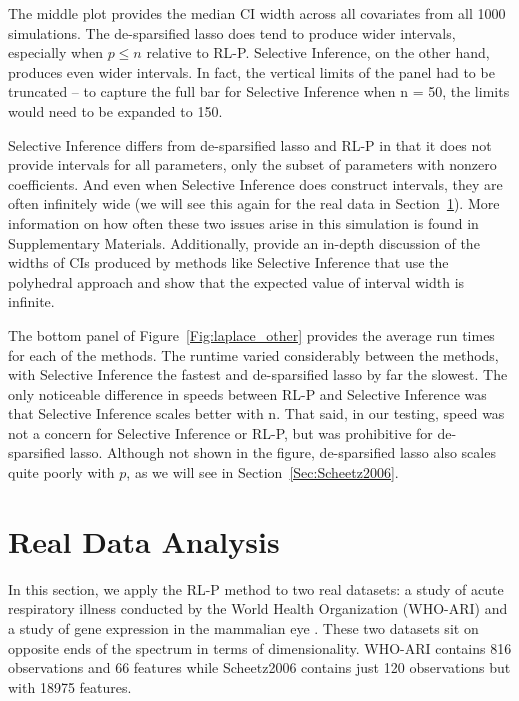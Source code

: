 The middle plot provides the median CI width across all covariates from all 1000 simulations. The de-sparsified lasso does tend to produce wider intervals, especially when $p \le n$ relative to RL-P. Selective Inference, on the other hand, produces even wider intervals. In fact, the vertical limits of the panel had to be truncated -- to capture the full bar for Selective Inference when n = 50, the limits would need to be expanded to 150.

Selective Inference differs from de-sparsified lasso and RL-P in that it does not provide intervals for all parameters, only the subset of parameters with nonzero coefficients. And even when Selective Inference does construct intervals, they are often infinitely wide (we will see this again for the real data in Section~\ref{Sec:RDA}). More information on how often these two issues arise in this simulation is found in Supplementary Materials. Additionally, \cite{Kivaranovic2021} provide an in-depth discussion of the widths of CIs produced by methods like Selective Inference that use the polyhedral approach and show that the expected value of interval width is infinite.

The bottom panel of Figure~\ref{Fig:laplace_other} provides the average run times for each of the methods. The runtime varied considerably between the methods, with Selective Inference the fastest and de-sparsified lasso by far the slowest.  The only noticeable difference in speeds between RL-P and Selective Inference was that Selective Inference scales better with n. That said, in our testing, speed was not a concern for Selective Inference or RL-P, but was prohibitive for de-sparsified lasso. Although not shown in the figure, de-sparsified lasso also scales quite poorly with $p$, as we will see in Section~\ref{Sec:Scheetz2006}.

\section{Real Data Analysis}\label{Sec:RDA}

In this section, we apply the RL-P method to two real datasets: a study of acute respiratory illness conducted by the World Health Organization (WHO-ARI) and a study of gene expression in the mammalian eye \citep{Scheetz2006}. These two datasets sit on opposite ends of the spectrum in terms of dimensionality. WHO-ARI contains 816 observations and 66 features while Scheetz2006 contains just 120 observations but with 18975 features.

